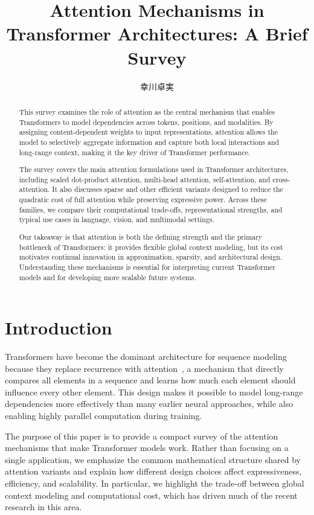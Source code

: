 \documentclass[a4paper,11pt]{article}
\title{Attention Mechanisms in Transformer Architectures: A Brief Survey}
\author{幸川卓実}
\begin{document}
\maketitle

\begin{abstract}
  This survey examines the role of attention as the central mechanism that enables Transformers to model dependencies across tokens, positions, and modalities. By assigning content-dependent weights to input representations, attention allows the model to selectively aggregate information and capture both local interactions and long-range context, making it the key driver of Transformer performance.

  The survey covers the main attention formulations used in Transformer architectures, including scaled dot-product attention, multi-head attention, self-attention, and cross-attention. It also discusses sparse and other efficient variants designed to reduce the quadratic cost of full attention while preserving expressive power. Across these families, we compare their computational trade-offs, representational strengths, and typical use cases in language, vision, and multimodal settings.

  Our takeaway is that attention is both the defining strength and the primary bottleneck of Transformers: it provides flexible global context modeling, but its cost motivates continual innovation in approximation, sparsity, and architectural design. Understanding these mechanisms is essential for interpreting current Transformer models and for developing more scalable future systems.
\end{abstract}

\section{Introduction}

Transformers  have become the dominant architecture for sequence modeling because they replace recurrence with attention~\cite{vaswani2017attention}, a mechanism that directly compares all elements in a sequence and learns how much each element should influence every other element. This design makes it possible to model long-range dependencies more effectively than many earlier neural approaches, while also enabling highly parallel computation during training.

The purpose of this paper is to provide a compact survey of the attention mechanisms that make Transformer models work. Rather than focusing on a single application, we emphasize the common mathematical structure shared by attention variants and explain how different design choices affect expressiveness, efficiency, and scalability. In particular, we highlight the trade-off between global context modeling and computational cost, which has driven much of the recent research in this area.
\end{document}
